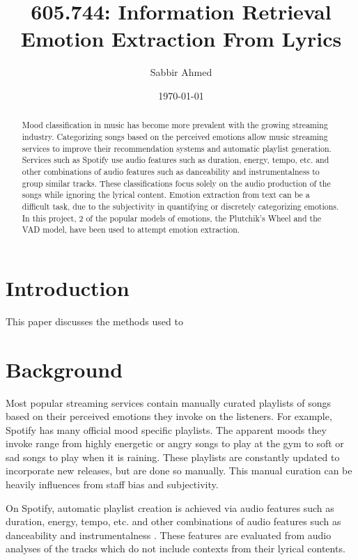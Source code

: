\documentclass[11pt]{article}
\title{605.744: Information Retrieval \\ Emotion Extraction From Lyrics}
\author{Sabbir Ahmed}
\date{\today}
\begin{document}
\maketitle
\tableofcontents
\clearpage
\newpage

\begin{abstract}
  \noindent Mood classification in music has become more prevalent with the growing streaming industry. Categorizing songs based on the perceived emotions allow music streaming services to improve their recommendation systems and automatic playlist generation. Services such as Spotify use audio features such as duration, energy, tempo, etc. and other combinations of audio features such as danceability and instrumentalness to group similar tracks. These classifications focus solely on the audio production of the songs while ignoring the lyrical content. Emotion extraction from text can be a difficult task, due to the subjectivity in quantifying or discretely categorizing emotions. In this project, 2 of the popular models of emotions, the Plutchik's Wheel and the VAD model, have been used to attempt emotion extraction.
\end{abstract}

\section{Introduction}
This paper discusses the methods used to

\section{Background}

Most popular streaming services contain manually curated playlists of songs based on their perceived emotions they invoke on the listeners. For example, Spotify has many official mood specific playlists. The apparent moods they invoke range from highly energetic or angry songs to play at the gym to soft or sad songs to play when it is raining. These playlists are constantly updated to incorporate new releases, but are done so manually. This manual curation can be heavily influences from staff bias and subjectivity.

On Spotify, automatic playlist creation is achieved via audio features such as duration, energy, tempo, etc. and other combinations of audio features such as danceability and instrumentalness \cite{spotify}. These features are evaluated from audio analyses of the tracks which do not include contexts from their lyrical contents.
\end{document}
